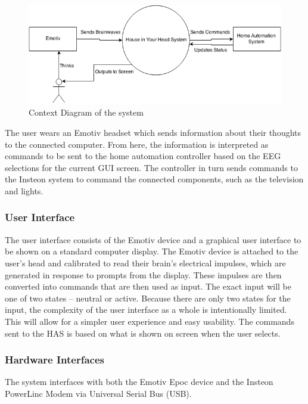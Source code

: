 \documentclass{article}
\begin{document}
\begin{figure}[h!]
\includegraphics[width=\textwidth]{Senior_Design_Context_Diagram_V1.png}
\caption{Context Diagram of the system}
\label{fig:contextdia}
\end{figure}

The user wears an Emotiv headset which sends information about their thoughts
to the connected computer. From here, the information is interpreted as
commands to be sent to the home automation controller based on the EEG selections for the current GUI screen. The controller in turn sends 
commands to the Insteon system to command the connected components, such as the television and lights.

\subsubsection{User Interface}
The user interface consists of the Emotiv device and a graphical user
interface to be shown on a standard computer display. The Emotiv device is
attached to the user's head and calibrated to read their brain's electrical impulses, which are generated in response to prompts from the display. These impulses are
then converted into commands that are then used as input. The exact input will
be one of two states – neutral or active. Because there are only two states
for the input, the complexity of the user interface as a whole is
intentionally limited. This will allow for a simpler user experience and
easy usability. The commands sent to the HAS is based on what is shown on screen when the user selects.

\subsubsection{Hardware Interfaces}
The system interfaces with both the Emotiv Epoc device and the Insteon
PowerLinc Modem via Universal Serial Bus (USB).
\end{document}
